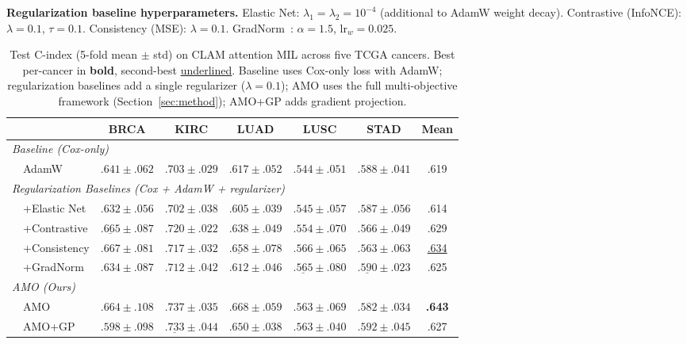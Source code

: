 \documentclass[10pt,twocolumn,letterpaper]{article}
\begin{document}
\noindent\textbf{Regularization baseline hyperparameters.}
Elastic Net: $\lambda_1 = \lambda_2 = 10^{-4}$ (additional to
AdamW weight decay). Contrastive (InfoNCE): $\lambda = 0.1$,
$\tau = 0.1$. Consistency (MSE): $\lambda = 0.1$.
GradNorm~\cite{chen2018gradnorm}: $\alpha = 1.5$, lr$_w = 0.025$.


\begin{table}[t]
\centering
\caption{Test C-index (5-fold mean $\pm$ std) on CLAM attention MIL
across five TCGA cancers. Best per-cancer in \textbf{bold},
second-best \underline{underlined}.
Baseline uses Cox-only loss with AdamW; regularization baselines
add a single regularizer ($\lambda\!=\!0.1$);
AMO uses the full multi-objective framework
(Section~\ref{sec:method}); AMO+GP adds gradient projection.}
\label{tab:clam_results}
\begin{tabular}{ll|ccccc|c}
\toprule
& & BRCA & KIRC & LUAD & LUSC & STAD & Mean \\
\midrule
\multicolumn{8}{l}{\textit{Baseline (Cox-only)}} \\
& AdamW     & $.641 \pm .062$ & $.703 \pm .029$ &
  $.617 \pm .052$ & $.544 \pm .051$ & $.588 \pm .041$ & .619 \\
\midrule
\multicolumn{8}{l}{\textit{Regularization Baselines (Cox + AdamW + regularizer)}} \\
& +Elastic Net & $.632 \pm .056$ & $.702 \pm .038$ &
  $.605 \pm .039$ & $.545 \pm .057$ & $.587 \pm .056$ & .614 \\
& +Contrastive & $\underline{.665} \pm .087$ & $.720 \pm .022$ &
  $.638 \pm .049$ & $.554 \pm .070$ & $.566 \pm .049$ & .629 \\
& +Consistency & $\mathbf{.667} \pm .081$ & $.717 \pm .032$ &
  $\underline{.658} \pm .078$ & $\mathbf{.566} \pm .065$ & $.563 \pm .063$ & \underline{.634} \\
& +GradNorm & $.634 \pm .087$ & $.712 \pm .042$ &
  $.612 \pm .046$ & $\underline{.565} \pm .080$ & $\underline{.590} \pm .023$ & .625 \\
\midrule
\multicolumn{8}{l}{\textit{AMO (Ours)}} \\
& AMO     & $.664 \pm .108$ &
  $\mathbf{.737} \pm .035$ & $\mathbf{.668} \pm .059$ &
  $.563 \pm .069$ & $.582 \pm .034$ &
  \textbf{.643} \\
& AMO+GP  & $.598 \pm .098$ &
  $\underline{.733} \pm .044$ & $.650 \pm .038$ &
  $.563 \pm .040$ & $\mathbf{.592} \pm .045$ &
  .627 \\
\bottomrule
\end{tabular}
\end{table}
\end{document}

